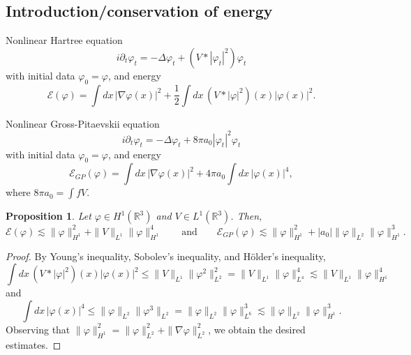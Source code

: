 \documentclass[11pt,a4paper]{scrartcl}
\newtheorem{prp}[thm]{Proposition}
\newcommand{\R}{\mathds{R}}
\begin{document}
\subsection{Introduction/conservation of energy}


Nonlinear Hartree equation
\begin{displaymath}
  i \partial_t \varphi_t = - \Delta \varphi_t + (V * |\varphi_t|^2) \varphi_t
\end{displaymath}
with initial data $\varphi_0 = \varphi$, and energy
\begin{displaymath}
  \mathcal{E}(\varphi) = \int dx \, |\nabla \varphi(x)|^2 + \frac{1}{2} \int
  dx \, (V * |\varphi|^2)(x) |\varphi(x)|^2.
\end{displaymath}


Nonlinear Gross-Pitaevskii equation
\begin{displaymath}
  i \partial_t \varphi_t = - \Delta \varphi_t + 8 \pi a_0 |\varphi_t|^2
  \varphi_t
\end{displaymath}
with initial data $\varphi_0 = \varphi$, and energy
\begin{displaymath}
  \mathcal{E}_{GP}(\varphi) = \int dx \, |\nabla \varphi(x)|^2 + 4 \pi a_0
  \int dx \, |\varphi(x)|^4,
\end{displaymath}
where $8 \pi a_0 = \int f V$.


\begin{prp}
  \label{p:energy}
  Let $\varphi \in H^1(\R^3)$ and $V \in L^1(\R^3)$. Then,
  \begin{displaymath}
    \mathcal{E}(\varphi) \apprle \| \varphi \|_{H^1}^2 + \| V \|_{L^1} \|
    \varphi \|_{H^1}^4 \qquad \text{and} \qquad \mathcal{E}_{GP}(\varphi)
    \apprle \| \varphi \|_{H^1}^2 + |a_0| \| \varphi \|_{L^2} \| \varphi
    \|_{H^1}^3.
  \end{displaymath}
\end{prp}


\begin{proof}
  By Young's inequality, Sobolev's inequality, and H\"older's inequality, 
  \begin{displaymath}
    \int dx \, (V * |\varphi|^2)(x) |\varphi(x)|^2 \le \| V \|_{L^1} \|
    \varphi^2 \|_{L^2}^2 = \| V \|_{L^1} \| \varphi \|_{L^4}^4 \apprle \| V
    \|_{L^1} \| \varphi \|_{H^1}^4
  \end{displaymath}
  and
  \begin{displaymath}
    \int dx \, |\varphi(x)|^4 \le \| \varphi \|_{L^2} \| \varphi^3 \|_{L^2} =
    \| \varphi \|_{L^2} \| \varphi \|_{L^6}^3 \apprle \| \varphi \|_{L^2} \|
    \varphi \|_{H^1}^3.
  \end{displaymath}
  Observing that $\| \varphi \|_{H^1}^2 = \| \varphi \|_{L^2}^2 + \| \nabla
  \varphi \|_{L^2}^2$, we obtain the desired estimates.
\end{proof}
\end{document}
